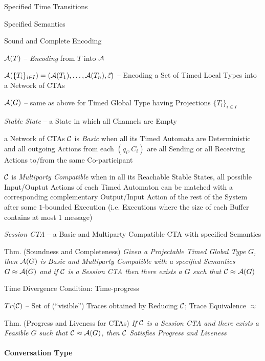 Specified Time Transitions

Specified Semantics

Sound and Complete Encoding

$\mathcal{A}(T)$ -- \emph{Encoding} from $T$ into $\mathcal{A}$

$\mathcal{A}(\{T_i\}_{i \in I}) =
(\mathcal{A}(T_1),\ldots,\mathcal{A}(T_n),\vec{\varepsilon})$ -- Encoding
a Set of Timed Local Types into a Network of CTAs

$\mathcal{A}(G)$ -- same as above for Timed Global Type having
Projections $\{T_i\}_{i \in I}$

\emph{Stable State} -- a State in which all Channels are Empty

a Network of CTAs $\mathcal{C}$ is \emph{Basic} when all its Timed
Automata are Deterministic and all outgoing Actions from each
$(q_i,C_i)$ are all Sending or all Receiving Actions to/from the same
Co-participant

$\mathcal{C}$ is \emph{Multiparty Compatible} when in all its Reachable
Stable States, all possible Input/Ouptut Actions of each Timed
Automaton can be matched with a corresponding complementary
Output/Input Action of the rest of the System after some $1$-bounded
Execution (i.e. Executions where the size of each Buffer contains at
most 1 message)

\emph{Session CTA} -- a Basic and Multiparty Compatible CTA with
specified Semantics

Thm. (Soundness and Completeness) \emph{Given a Projectable Timed
  Global Type $G$, then $\mathcal{A}(G)$ is Basic and Multiparty
  Compatible with a specified Semantics $G \approx \mathcal{A}(G)$ and
  if $\mathcal{C}$ is a Session CTA then there exists a $G$ such that
  $\mathcal{C} \approx \mathcal{A}(G)$}

Time Divergence Condition: Time-progress

$Tr(\mathcal{C})$ -- Set of (``visible'') Traces obtained by Reducing
$\mathcal{C}$; Trace Equivalence $\approx$

Thm. (Progress and Liveness for CTAs) \emph{If $\mathcal{C}$ is a
  Session CTA and there exists a Feasible $G$ such that $\mathcal{C}
  \approx \mathcal{A}(G)$, then $\mathcal{C}$ Satisfies Progress and
  Liveness}


\endgroup



\paragraph{Conversation Type}\label{sec:conversation_type}\hfill


